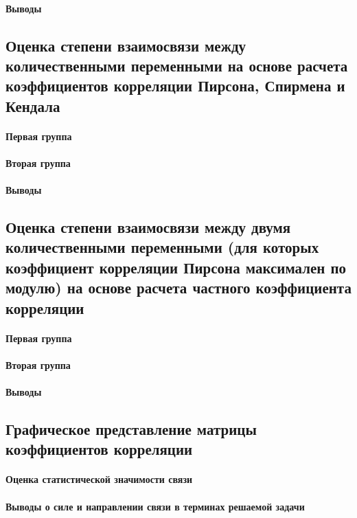 \paragraph{Выводы}




\subsection{Оценка степени взаимосвязи между количественными переменными на основе расчета коэффициентов корреляции Пирсона, Спирмена и Кендала}

\paragraph{Первая группа}

\paragraph{Вторая группа}

\paragraph{Выводы}




\subsection{Оценка степени взаимосвязи между двумя количественными переменными (для которых коэффициент корреляции Пирсона максимален по модулю) на основе расчета частного коэффициента корреляции}

\paragraph{Первая группа}

\paragraph{Вторая группа}

\paragraph{Выводы}




\subsection{Графическое представление матрицы коэффициентов корреляции}

\paragraph{Оценка статистической значимости связи}

\paragraph{Выводы о силе и направлении связи в терминах решаемой задачи}

